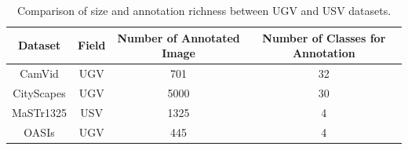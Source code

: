\begin{table}[ht!]
    \centering
    \caption{Comparison of size and annotation richness between UGV and USV datasets.}
    \label{tab:dataset-compare}
    \begin{tabular}{c|c|c|c}
    \textbf{Dataset} & \textbf{Field} & \textbf{Number of Annotated Image } & \textbf{Number of Classes for Annotation} \\ \hline
    CamVid \cite{CamVid} & UGV & 701  & 32 \\ \hline
    CityScapes \cite{Cityscapes} & UGV & 5000  & 30 \\ \hline
    MaSTr1325 \cite{MaSTr1325} & USV & 1325  & 4 \\ \hline
    OASIs \cite{OASIs} & UGV & 445 & 4 \\ \hline
    \end{tabular}
\end{table}
